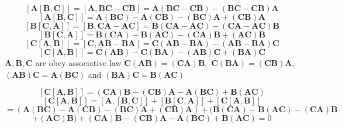 $$
[\mathbf{A}[\mathbf{B}, \mathbf{C}]]=[\mathbf{A}, \mathbf{B} \mathbf{C}-\mathbf{C} \mathbf{B}]=\mathbf{A}(\mathbf{B} \mathbf{C}-\mathbf{C} \mathbf{B})-(\mathbf{B} \mathbf{C}-\mathbf{C} \mathbf{B}) \mathbf{A} $$
$$[\mathbf{A}[\mathbf{B}, \mathbf{C}]]=\mathbf{A}(\mathbf{B} \mathbf{C})-\mathbf{A}(\mathbf{C} \mathbf{B})-(\mathbf{B} \mathbf{C}) \mathbf{A}+(\mathbf{C} \mathbf{B}) \mathbf{A} $$
$$[\mathbf{B}[\mathbf{C}, \mathbf{A}]]=[\mathbf{B}, \mathbf{C} \mathbf{A}-\mathbf{A} \mathbf{C}]=\mathbf{B}(\mathbf{C A}-\mathbf{A} \mathbf{C})-(\mathbf{C A}-\mathbf{A} \mathbf{C}) \mathbf{B} $$
$$[\mathbf{B}[\mathbf{C}, \mathbf{A}]]=\mathbf{B}(\mathbf{C} \mathbf{A})-\mathbf{B}(\mathbf{A} \mathbf{C})-(\mathbf{C} \mathbf{A}) \mathbf{B}+(\mathbf{A} \mathbf{C}) \mathbf{B} $$
$$[\mathbf{C}[\mathbf{A}, \mathbf{B}]]=[\mathbf{C}, \mathbf{A} \mathbf{B}-\mathbf{B} \mathbf{A}]=\mathbf{C}(\mathbf{A} \mathbf{B}-\mathbf{B} \mathbf{A})-(\mathbf{A} \mathbf{B}-\mathbf{B} \mathbf{A}) \mathbf{C} $$
$$[\mathbf{C}[\mathbf{A}, \mathbf{B}]]=\mathbf{C}(\mathbf{A} \mathbf{B})-\mathbf{C}(\mathbf{B} \mathbf{A})-(\mathbf{A} \mathbf{B}) \mathbf{C}+(\mathbf{B} \mathbf{A}) \mathbf{C} $$
$\mathbf{A}, \mathbf{B}, \mathbf{C}$ are obey associative law $ \mathbf{C}(\mathbf{A} \mathbf{B})=(\mathbf{C} \mathbf{A}) \mathbf{B},$ $\mathbf{C}(\mathbf{B} \mathbf{A})=(\mathbf{C} \mathbf{B}) \mathbf{A},$ $(\mathbf{A} \mathbf{B}) \mathbf{C}=\mathbf{A}(\mathbf{B} \mathbf{C})$ and $(\mathbf{B} \mathbf{A}) \mathbf{C}=\mathbf{B}(\mathbf{A} \mathbf{C})$


$$[\mathbf{C}[\mathbf{A}, \mathbf{B}]]=(\mathbf{C} \mathbf{A}) \mathbf{B}-(\mathbf{C} \mathbf{B}) \mathbf{A}-\mathbf{A}(\mathbf{B} \mathbf{C})+\mathbf{B}(\mathbf{A} \mathbf{C})$$
$$[\mathbf{C}[\mathbf{A}, \mathbf{B}]]=[\mathbf{A},[\mathbf{B}, \mathbf{C}]]+[\mathbf{B}[\mathbf{C}, \mathbf{A}]]+[\mathbf{C}[\mathbf{A}, \mathbf{B}]] $$
$$=(\mathbf{A}(\mathbf{B} \mathbf{C})-\mathbf{A}(\mathbf{C} \mathbf{B})-(\mathbf{B} \mathbf{C}) \mathbf{A}+(\mathbf{C} \mathbf{B}) \mathbf{A})+(\mathbf{B}(\mathbf{C} \mathbf{A})-\mathbf{B}(\mathbf{A} \mathbf{C})-(\mathbf{C} \mathbf{A}) \mathbf{B} $$
$$+(\mathbf{A} \mathbf{C}) \mathbf{B})+(\mathbf{C} \mathbf{A}) \mathbf{B}-(\mathbf{C} \mathbf{B}) \mathbf{A}-\mathbf{A}(\mathbf{B} \mathbf{C})+\mathbf{B}(\mathbf{A} \mathbf{C})=0$$

\newpage

